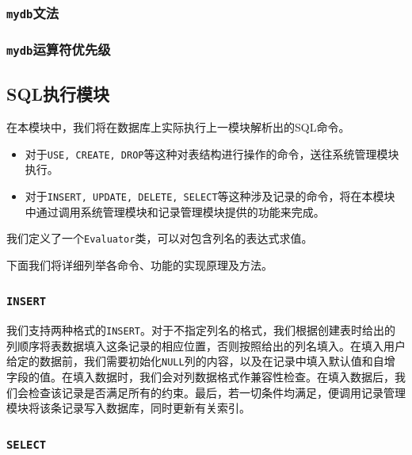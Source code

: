 \documentclass[11pt, a4paper]{article}
\begin{document}


\subsubsection{\texttt{mydb}文法}



\subsubsection{\texttt{mydb}运算符优先级}



\subsection{SQL执行模块}

在本模块中，我们将在数据库上实际执行上一模块解析出的SQL命令。

\begin{itemize}
\item 对于\texttt{USE, CREATE, DROP}等这种对表结构进行操作的命令，送往系统管理模块执行。
\item 对于\texttt{INSERT, UPDATE, DELETE, SELECT}等这种涉及记录的命令，将在本模块中通过调用系统管理模块和记录管理模块提供的功能来完成。
\end{itemize}

我们定义了一个\texttt{Evaluator}类，可以对包含列名的表达式求值。

下面我们将详细列举各命令、功能的实现原理及方法。

\subsubsection{\texttt{INSERT}}\label{sec:insert}

我们支持两种格式的\texttt{INSERT}。对于不指定列名的格式，我们根据创建表时给出的列顺序将表数据填入这条记录的相应位置，否则按照给出的列名填入。在填入用户给定的数据前，我们需要初始化\texttt{NULL}列的内容，以及在记录中填入默认值和自增字段的值。在填入数据时，我们会对列数据格式作兼容性检查。在填入数据后，我们会检查该记录是否满足所有的约束。最后，若一切条件均满足，便调用记录管理模块将该条记录写入数据库，同时更新有关索引。

\subsubsection{\texttt{SELECT}}\label{sec:select}
\end{document}
